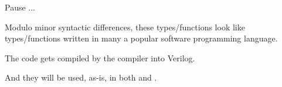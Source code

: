 
\begin{frame}[fragile]

\begin{center}
  {\LARGE Pause ...}

 \vspace*{10ex}

 \begin{minipage}{0.9\textwidth}

   Modulo minor syntactic differences, these types/functions look like
   types/functions written in many a popular software programming
   language.

   \vspace*{2ex}

   The {\BSV} code gets compiled by the {\bsc} compiler into Verilog.

   \vspace*{10ex}

   And they will be used, as-is, in both {\DRUM} and {\FIFE}.
 \end{minipage}

\end{center}

\end{frame}


\section{\DRUM}

